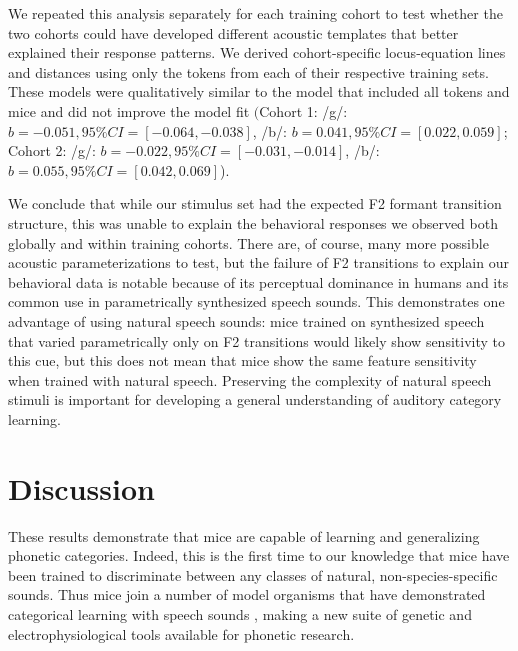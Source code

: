 \documentclass[11pt]{article}\usepackage[]{graphicx}\usepackage[]{color}
\begin{document}
We repeated this analysis separately for each training cohort to test whether the two cohorts could have developed different acoustic templates that better explained their response patterns. We derived cohort-specific locus-equation lines and distances using only the tokens from each of their respective training sets. These models were qualitatively similar to the model that included all tokens and mice and did not improve the model fit $($Cohort 1: /g/: $b=-0.051, 95\% CI = [-0.064, -0.038]$, /b/: $b=0.041, 95\% CI = [0.022, 0.059]$; Cohort 2: /g/: $b=-0.022, 95\% CI = [-0.031, -0.014]$, /b/: $b=0.055, 95\% CI = [0.042, 0.069]$).

We conclude that while our stimulus set had the expected F2 formant transition structure, this was unable to explain the behavioral responses we observed both globally and within training cohorts. There are, of course, many more possible acoustic parameterizations to test, but the failure of F2 transitions to explain our behavioral data is notable because of its perceptual dominance in humans and its common use in parametrically synthesized speech sounds. This demonstrates one advantage of using natural speech sounds: mice trained on synthesized speech that varied parametrically only on F2 transitions would likely show sensitivity to this cue, but this does not mean that mice show the same feature sensitivity when trained with natural speech. Preserving the complexity of natural speech stimuli is important for developing a general understanding of auditory category learning.

%
%

\section{\Large Discussion}

These results demonstrate that mice are capable of learning and generalizing phonetic categories. Indeed, this is the first time to our knowledge that mice have been trained to discriminate between any classes of natural, non-species-specific sounds. Thus mice join a number of model organisms that have demonstrated categorical learning with speech sounds \cite{Kluender1987,Lotto1997,Kluender2000,Kuhl1978,Engineer2015,Kuhl1983,Dooling1995}, making a new suite of genetic and electrophysiological tools available for phonetic research.
\end{document}
